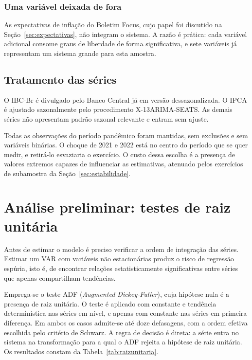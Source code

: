 \documentclass[12pt,openright,oneside,a4paper,portuguese,brazil]{abntex2}
\begin{document}
\subsubsection{Uma variável deixada de fora}

As expectativas de inflação do Boletim Focus, cujo papel foi discutido na
Seção~\ref{sec:expectativas}, não integram o sistema. A razão é prática: cada
variável adicional consome graus de liberdade de forma significativa, e sete
variáveis já representam um sistema grande para esta amostra.

\subsection{Tratamento das séries}

O IBC-Br é divulgado pelo Banco Central já em versão dessazonalizada. O IPCA é
ajustado sazonalmente pelo procedimento X-13ARIMA-SEATS. As demais séries não
apresentam padrão sazonal relevante e entram sem ajuste.

Todas as observações do período pandêmico foram mantidas, sem exclusões e sem
variáveis binárias. O choque de 2021 e 2022 está no centro do período que se
quer medir, e retirá-lo esvaziaria o exercício. O custo dessa escolha é a
presença de valores extremos capazes de influenciar as estimativas, atenuado
pelos exercícios de subamostra da Seção~\ref{sec:estabilidade}.

\section{Análise preliminar: testes de raiz unitária}
\label{sec:estacionariedade}

Antes de estimar o modelo é preciso verificar a ordem de integração das séries.
Estimar um VAR com variáveis não estacionárias produz o risco de regressão
espúria, isto é, de encontrar relações estatisticamente significativas entre
séries que apenas compartilham tendências.

Emprega-se o teste ADF (\textit{Augmented Dickey-Fuller}), cuja hipótese nula é
a presença de raiz unitária. O teste é aplicado com constante e tendência
determinística nas séries em nível, e apenas com constante nas séries em
primeira diferença. Em ambos os casos admite-se até doze defasagens, com a
ordem efetiva escolhida pelo critério de Schwarz. A regra de decisão é direta:
a série entra no sistema na transformação para a qual o ADF rejeita a hipótese
de raiz unitária. Os resultados constam da Tabela~\ref{tab:raizunitaria}.
\end{document}
